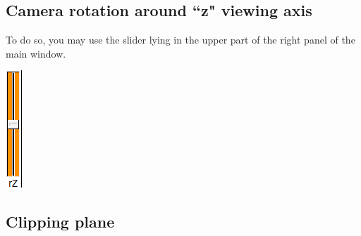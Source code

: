 \subsection{Camera rotation around ``z" viewing axis}

\begin{minipage}{0.7\textwidth}
To do so, you may use the slider lying in the upper part of the right panel of the main window.
\end{minipage}    
\begin{minipage}{0.25\textwidth}\centering
  \includegraphics{images/Icons/Rotation_z.png}
 \end{minipage}    



\subsection{Clipping plane}

